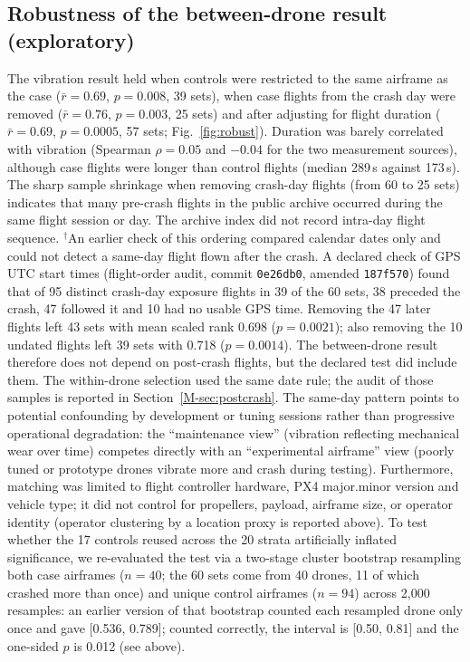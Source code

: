 \documentclass[preprint,12pt]{elsarticle}
\begin{document}
\subsection*{Robustness of the between-drone result (exploratory)}
\label{sec:robust}
The vibration result held when controls were restricted to the same airframe as the case ($\bar r=0.69$, $p=0.008$,
39 sets), when case flights from the crash day were removed ($\bar r=0.76$, $p=0.003$, 25 sets) and after adjusting
for flight duration ($\bar r=0.69$, $p=0.0005$, 57 sets; Fig.~\ref{fig:robust}). Duration was barely correlated with
vibration (Spearman $\rho=0.05$ and $-0.04$ for the two measurement sources), although case flights were longer than
control flights (median 289\,s against 173\,s). The sharp sample shrinkage when removing crash-day flights (from 60 to 25
sets) indicates that many pre-crash flights in the public archive occurred during the same flight session or day. The archive
index did not record intra-day flight sequence. $^\dagger$An earlier check of this ordering compared calendar dates only and could not detect a same-day flight flown after the crash. A declared check of GPS UTC start times (flight-order audit, commit \texttt{0e26db0}, amended \texttt{187f570}) found that of 95 distinct crash-day exposure flights in 39 of the 60 sets, 38 preceded the crash, 47 followed it and 10 had no usable GPS time. Removing the 47 later flights left 43 sets with mean scaled rank 0.698 ($p=0.0021$); also removing the 10 undated flights left 39 sets with 0.718 ($p=0.0014$). The between-drone result therefore does not depend on post-crash flights, but the declared test did include them. The within-drone selection used the same date rule; the audit of those samples is reported in Section~\ref{M-sec:postcrash}. The same-day pattern points to potential confounding by development or tuning sessions
rather than progressive operational degradation: the ``maintenance view'' (vibration reflecting mechanical wear over time)
competes directly with an ``experimental airframe'' view (poorly tuned or prototype drones vibrate more and crash during
testing). Furthermore, matching was limited to flight controller hardware, PX4 major.minor version and vehicle type; it did
not control for propellers, payload, airframe size, or operator identity (operator clustering by a location proxy is reported above). To test whether the 17 controls reused across the 20 strata artificially inflated significance, we re-evaluated the test via a two-stage cluster bootstrap resampling both case airframes ($n=40$; the 60 sets come from 40 drones, 11 of which crashed more than once) and unique control airframes ($n=94$) across 2,000 resamples: an earlier version of that bootstrap counted each resampled drone only once and gave [0.536, 0.789]; counted correctly, the interval is [0.50, 0.81] and the one-sided $p$ is 0.012 (see above).
\end{document}
